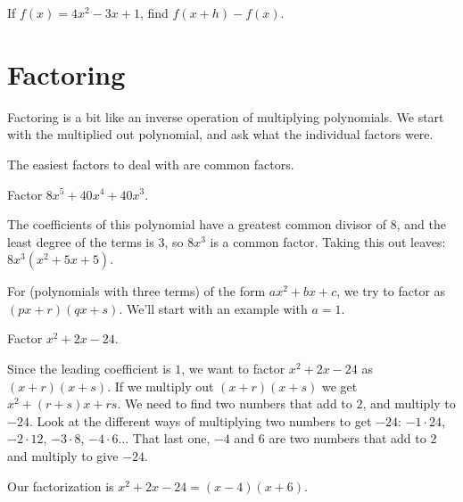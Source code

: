\documentclass{ximera}
\begin{document}
\begin{problem}
	If $f(x)=4x^2-3x+1$, find $f(x+h)-f(x)$.
	\begin{multipleChoice}
	\end{multipleChoice}
\end{problem}

\section{Factoring}
Factoring is a bit like an inverse operation of multiplying polynomials.  We start with the multiplied out polynomial, and ask what the individual factors were.

The easiest factors to deal with are common factors.
\begin{example}
	Factor $8x^5 + 40x^4 + 40x^3$.
	\begin{explanation}
		The coefficients of this polynomial have a greatest common divisor of $8$, and the least degree of the terms is $3$, so
		$8x^3$ is a common factor.  Taking this out leaves:
		$\displaystyle 8x^3( x^2+5x+5)$.
	\end{explanation}
\end{example}


For  (polynomials with three terms) of the form $ax^2 + bx + c$, we try to factor as $(px+r)(qx+s)$.  We'll start with an example with $a=1$.
\begin{example}
	Factor $x^2+2x-24$.
	\begin{explanation}
		Since the leading coefficient is $1$, we want to factor $x^2+2x-24$ as $(x+r)(x+s)$.  If we multiply out $(x+r)(x+s)$ we get
		$x^2 + (r+s)x + rs$.  We need to find two numbers that add to $2$,
		and multiply to $-24$.  Look at the different ways of multiplying two numbers to get $-24$:  $-1 \cdot 24$, $-2 \cdot 12$, $-3 \cdot 8$, $-4 \cdot 6$...
		That last one, $-4$ and $6$ are two numbers that add to $2$ and multiply to give $-24$.
		
		Our factorization is $x^2+2x-24 = (x-4)(x+6)$.
	\end{explanation}
\end{example}
\end{document}
